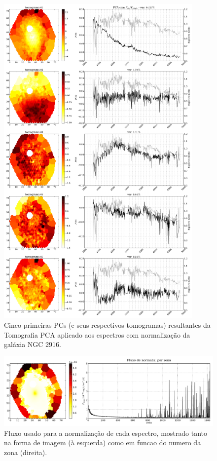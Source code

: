 \begin{figure}
    \includegraphics[width=0.9\textwidth]{figuras/K0277-tomo-obs-norm.pdf}
    \caption[Tomogramas de 1 a 5 da gal\'axia NGC 2916 - $F_{obs} / F_{\lambda 5365}$.]
    {Cinco primeiras PCs (e seus respectivos tomogramas) resultantes da Tomografia PCA aplicado aos espectros com
    normalização da galáxia NGC 2916.}
    \label{fig:PCAaplic:K277tomofobsnorm}
\end{figure}

\begin{figure}
    \includegraphics[width=1.\textwidth]{figuras/K0277-fobs_norm.pdf}
    \caption[Fluxos de normalização para cada zona da galáxia K0277.]
    {Fluxo usado para a normalização de cada espectro, mostrado tanto na forma de imagem (à esquerda) como em funcao do numero da zona (direita).}
    \label{fig:PCAaplic:K277fobsnorm}
\end{figure}

